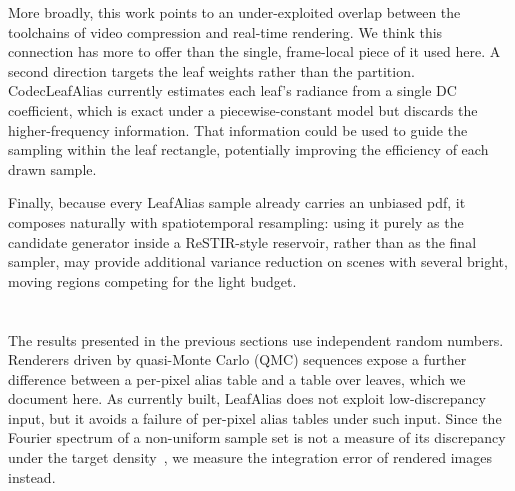 \documentclass[acmtog,review]{acmart}
\begin{document}
More broadly, this work points to an under-exploited overlap between the toolchains of video compression and real-time rendering. We think this connection has more to offer than the single, frame-local piece of it used here. 
A second direction targets the leaf weights rather than the partition. CodecLeafAlias currently estimates each leaf's radiance from a single DC coefficient, which is exact under a piecewise-constant model but discards the higher-frequency information. That information could be used to guide the sampling within the leaf rectangle, potentially improving the efficiency of each drawn sample. 

Finally, because every LeafAlias sample already carries an unbiased pdf, it composes naturally with spatiotemporal resampling: using it purely as the candidate generator inside a ReSTIR-style reservoir, rather than as the final sampler, may provide additional variance reduction on scenes with several bright, moving regions competing for the light budget.




\appendix

\section{\texorpdfstring{}{Per-pixel alias tables and low-discrepancy input}}
\label{app:qmc}

\newbegin
The results presented in the previous sections use independent random numbers. Renderers driven by quasi-Monte Carlo (QMC) sequences expose a further difference between a per-pixel alias table and a table over leaves, which we document here. As currently built, LeafAlias does not exploit low-discrepancy input, but it avoids a failure of per-pixel alias tables under such input. Since the Fourier spectrum of a non-uniform sample set is not a measure of its discrepancy under the target density~\cite{li2026gradient}, we measure the integration error of rendered images instead.
\end{document}
